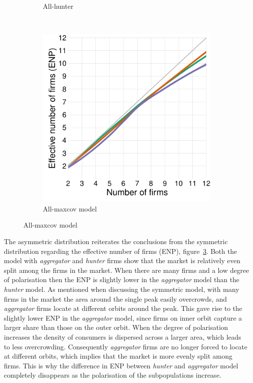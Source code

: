 \documentclass[preprint, 12pt]{elsarticle}
\begin{document}
\begin{figure}[ht!]
\begin{subfigure}[t]{0.315\textwidth}
		\caption{All-hunter}
		\label{fig:enp_hunter}
	\end{subfigure}
	~
	\begin{subfigure}[t]{0.315\textwidth}
		\centering
		\includegraphics[width=\textwidth, trim={8mm 0 0 0}]{Graphics/fig342a_tall.pdf}
		\caption{All-maxcov model}
		\label{fig:enp_maxcov}
	\end{subfigure}
	
	\label{fig:asymetric_enp}
\end{figure}

The asymmetric distribution reiterates the conclusions from the symmetric distribution regarding the effective number of firms (ENP), figure~\ref{fig:asymetric_enp}. Both the model with \emph{aggregator} and \emph{hunter} firms show that the market is relatively even split among the firms in the market. When there are many firms and a low degree of polarisation then the ENP is slightly lower in the \emph{aggregator} model than the \emph{hunter} model. As mentioned when discussing the symmetric model, with many firms in the market the area around the single peak easily overcrowds, and \emph{aggregator} firms locate at different orbits around the peak. This gave rise to the slightly lower ENP in the \emph{aggregator} model, since firms on inner orbit capture a larger share than those on the outer orbit. When the degree of polarisation increases the density of consumers is dispersed across a larger area, which leads to less overcrowding. Consequently \emph{aggregator} firms are no longer forced to locate at different orbits, which implies that the market is more evenly split among firms. This is why the difference in ENP between \emph{hunter} and \emph{aggregator} model completely disappears as the polarisation of the subpopulations increase.
\end{document}
